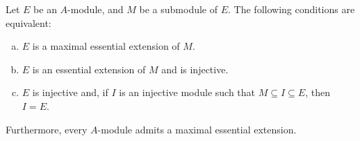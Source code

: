 \begin{theorem}
    \label{thm:maximal-essential-extension-equivalences}
    Let \(E\) be an \(A\)-module, and \(M\) be a submodule of \(E\). The following
    conditions are equivalent:
    \begin{enumerate}[(a)]\setlength\itemsep{0em}
        \item \(E\) is a maximal essential extension of \(M\).

        \item \(E\) is an essential extension of \(M\) and is injective.

        \item \(E\) is injective and, if \(I\) is an injective module such that \(M \subseteq I
              \subseteq E\), then \(I = E\).
    \end{enumerate}
    Furthermore, every \(A\)-module admits a maximal essential extension.
\end{theorem}

